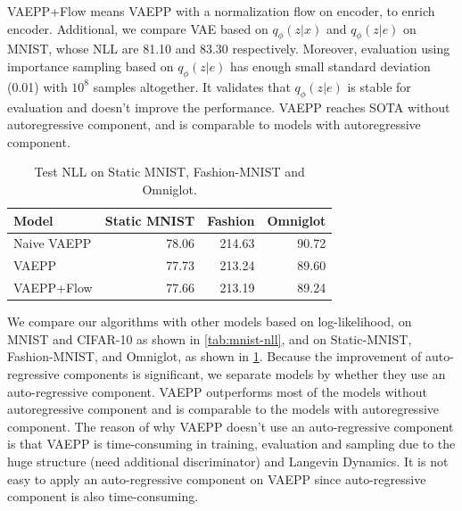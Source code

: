 \begin{table}[tb]
{%
VAEPP+Flow means VAEPP with a normalization flow on encoder, to enrich  encoder. 
Additional, we compare VAE based on $q_\phi(z|x)$ and $q_\phi(z|e)$ on MNIST, whose NLL are 81.10 and 83.30 respectively. Moreover, evaluation using importance sampling based on $q_\phi(z|e)$ has enough small standard deviation (0.01) with $10^8$ samples altogether. It validates that $q_\phi(z|e)$ is stable for evaluation and doesn't improve the performance. VAEPP reaches SOTA without autoregressive component, and is comparable to models with autoregressive component. }
\label{tab:mnist-nll}
\end{table}
\begin{table}[tb]
\centering
\begin{tabular}{lrrr}  
\toprule
Model   & Static MNIST & Fashion & Omniglot \\
\midrule
Naive VAEPP    &   78.06   &  214.63  &   90.72 \\
VAEPP          &   77.73   &  213.24   &   89.60  \\
VAEPP+Flow     &   77.66   &  213.19  &   89.24  \\
\bottomrule
\end{tabular}
\caption{Test NLL on Static MNIST, Fashion-MNIST and Omniglot.  }
\label{tab:cifar-nll}
\end{table}
We compare our algorithms with other models based on log-likelihood, on MNIST and CIFAR-10 as shown in \cref{tab:mnist-nll}, and on Static-MNIST, Fashion-MNIST, and Omniglot, as shown in \cref{tab:cifar-nll}. Because the improvement of auto-regressive components is significant, we separate models by whether they use an auto-regressive component. VAEPP outperforms most of the models without autoregressive component and is comparable to the models with autoregressive component. The reason of why VAEPP doesn't use an auto-regressive component is that VAEPP is time-consuming in training,  evaluation and sampling due to the huge structure (need additional discriminator) and Langevin Dynamics. It is not easy to apply an auto-regressive component on VAEPP since auto-regressive component is also time-consuming. 
